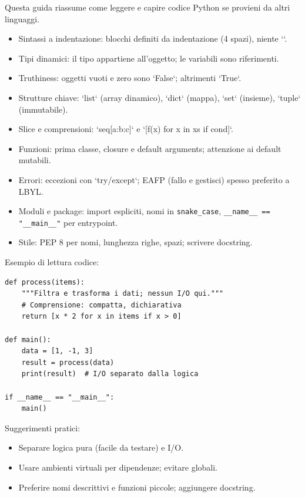 \begin{tcolorbox}[title=Guida per programmatori non-Python]
Questa guida riassume come leggere e capire codice Python se provieni da altri linguaggi.

\begin{itemize}
  \item Sintassi a indentazione: blocchi definiti da indentazione (4 spazi), niente `{}`.
  \item Tipi dinamici: il tipo appartiene all'oggetto; le variabili sono riferimenti.
  \item Truthiness: oggetti vuoti e zero sono `False`; altrimenti `True`.
  \item Strutture chiave: `list` (array dinamico), `dict` (mappa), `set` (insieme), `tuple` (immutabile).
  \item Slice e comprensioni: `seq[a:b:c]` e `[f(x) for x in xs if cond]`.
  \item Funzioni: prima classe, closure e default arguments; attenzione ai default mutabili.
  \item Errori: eccezioni con `try/except`; EAFP (fallo e gestisci) spesso preferito a LBYL.
  \item Moduli e package: import espliciti, nomi in \verb|snake_case|, \verb|__name__ == "__main__"| per entrypoint.
  \item Stile: PEP 8 per nomi, lunghezza righe, spazi; scrivere docstring.
\end{itemize}

Esempio di lettura codice:
\begin{lstlisting}
def process(items):
    """Filtra e trasforma i dati; nessun I/O qui."""
    # Comprensione: compatta, dichiarativa
    return [x * 2 for x in items if x > 0]

def main():
    data = [1, -1, 3]
    result = process(data)
    print(result)  # I/O separato dalla logica

if __name__ == "__main__":
    main()
\end{lstlisting}

Suggerimenti pratici:
\begin{itemize}
  \item Separare logica pura (facile da testare) e I/O.
  \item Usare ambienti virtuali per dipendenze; evitare globali.
  \item Preferire nomi descrittivi e funzioni piccole; aggiungere docstring.
\end{itemize}
\end{tcolorbox}
